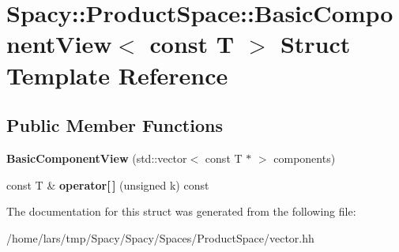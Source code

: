 \hypertarget{structSpacy_1_1ProductSpace_1_1BasicComponentView_3_01const_01T_01_4}{}\section{Spacy\+:\+:Product\+Space\+:\+:Basic\+Component\+View$<$ const T $>$ Struct Template Reference}
\label{structSpacy_1_1ProductSpace_1_1BasicComponentView_3_01const_01T_01_4}
\subsection*{Public Member Functions}
\begin{DoxyCompactItemize}
\item 
{\bfseries Basic\+Component\+View} (std\+::vector$<$ const T $\ast$ $>$ components)\hypertarget{structSpacy_1_1ProductSpace_1_1BasicComponentView_3_01const_01T_01_4_a52bd2d3c9fd74bd33998586a0e18899b}{}\label{structSpacy_1_1ProductSpace_1_1BasicComponentView_3_01const_01T_01_4_a52bd2d3c9fd74bd33998586a0e18899b}

\item 
const T \& {\bfseries operator\mbox{[}$\,$\mbox{]}} (unsigned k) const \hypertarget{structSpacy_1_1ProductSpace_1_1BasicComponentView_3_01const_01T_01_4_a1b6db224f3a762bae833aadc0898cda5}{}\label{structSpacy_1_1ProductSpace_1_1BasicComponentView_3_01const_01T_01_4_a1b6db224f3a762bae833aadc0898cda5}

\end{DoxyCompactItemize}


The documentation for this struct was generated from the following file\+:\begin{DoxyCompactItemize}
\item 
/home/lars/tmp/\+Spacy/\+Spacy/\+Spaces/\+Product\+Space/vector.\+hh\end{DoxyCompactItemize}
